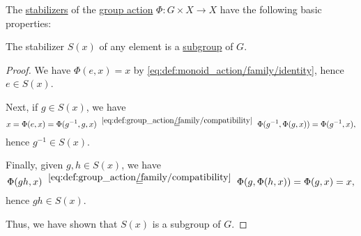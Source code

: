 \begin{proposition}\label{thm:def:group_action_stabilizer}
  The \hyperref[def:group_action_stabilizer]{stabilizers} of the \hyperref[def:group_action]{group action} \( \Phi: G \times X \to X \) have the following basic properties:
  \begin{thmenum}
     The stabilizer \( S(x) \) of any element is a \hyperref[def:group/submodel]{subgroup} of \( G \).
  \end{thmenum}
\end{proposition}
\begin{proof}
   We have \( \Phi(e, x) = x \) by \eqref{eq:def:monoid_action/family/identity}, hence \( e \in S(x) \).

  Next, if \( g \in S(x) \), we have
  \begin{equation*}
    x
    =
    \Phi(e, x)
    =
    \Phi(g^{-1}, g, x)
    \reloset {\eqref{eq:def:group_action/family/compatibility}} =
    \Phi(g^{-1}, \Phi(g, x))
    =
    \Phi(g^{-1}, x),
  \end{equation*}
  hence \( g^{-1} \in S(x) \).

  Finally, given \( g, h \in S(x) \), we have
  \begin{equation*}
    \Phi(gh, x)
    \reloset {\eqref{eq:def:group_action/family/compatibility}} =
    \Phi(g, \Phi(h, x))
    =
    \Phi(g, x)
    =
    x,
  \end{equation*}
  hence \( gh \in S(x) \).

  Thus, we have shown that \( S(x) \) is a subgroup of \( G \).
\end{proof}

